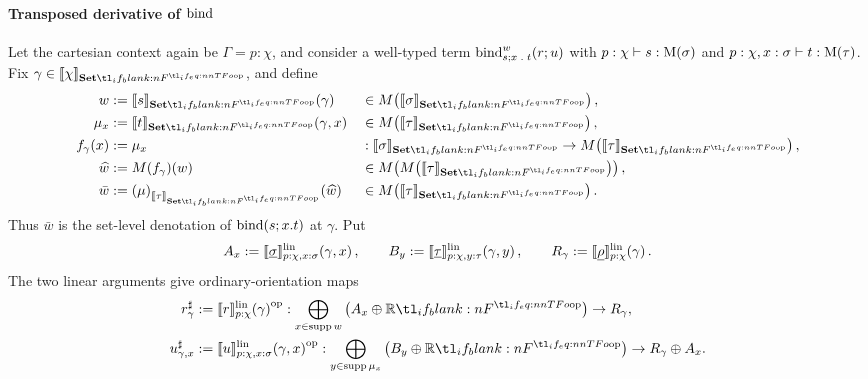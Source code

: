 \documentclass[11pt,a4paper]{article}
\theoremstyle{definition}
\theoremstyle{remark}
\providecommand{\supp}{\operatorname{supp}}
\providecommand{\lintype}[1]{\underline{#1}}
\providecommand{\setint}[1]{\llbracket #1\rrbracket_{\Set}}
\providecommand{\linint}[2]{\llbracket #1\rrbracket_{#2}^{\mathrm{lin}}}
\begin{document}
\paragraph{Transposed derivative of \( \opn[b]{bind} \)}
Let the cartesian context again be \(\Gamma=p:\chi\), and consider a well-typed term
\(
  \fn[n]{ \opn[b]{bind}^{w}_{s; x \; . \; t}}{ r ; u }
\)
with
\(p:\chi\vdash s:\Fun[nn]{\opn[b]{M}}{\sigma}\) and
\(p:\chi,x:\sigma\vdash t:\Fun[nn]{\opn[b]{M}}{\tau}\).
Fix \(\gamma\in\setint{\chi}\), and define
\begin{equation*}
  \begin{aligned}
    w
    &:= \fn[n]{\setint{s}}{\gamma}
      &&\in \Fun[nn]{M}{\setint{\sigma}},
    \\
    \mu_{x}
    &:= \fn[n]{\setint{t}}{\gamma,x}
      &&\in \Fun[nn]{M}{\setint{\tau}},
    \\
    f_{\gamma}(x)
    &:= \mu_{x}
      &&:\setint{\sigma}\to\Fun[nn]{M}{\setint{\tau}},
    \\
    \widehat w
    &:= \fn[n]{\Fun[nn]{M}{f_{\gamma}}}{w}
      &&\in \Fun[nn]{M}{\Fun[nn]{M}{\setint{\tau}}},
    \\
    \bar w
    &:= \fn[n]{\Nat[nn]{\mu}{\setint{\tau}}}{\widehat w}
      &&\in \Fun[nn]{M}{\setint{\tau}}.
  \end{aligned}
\end{equation*}
Thus \(\bar w\) is the set-level denotation of
\(\fn[n]{\opn[b]{bind}}{s;x.t}\) at \(\gamma\).  Put
\begin{equation*}
  A_{x}:=\fn[n]{\linint{\lintype{\sigma}}{p:\chi,x:\sigma}}{\gamma,x},
  \qquad
  B_{y}:=\fn[n]{\linint{\lintype{\tau}}{p:\chi,y:\tau}}{\gamma,y},
  \qquad
  R_{\gamma}:=\fn[n]{\linint{\lintype{\rho}}{p:\chi}}{\gamma}.
\end{equation*}
The two linear arguments give ordinary-orientation maps
\begin{equation*}
  \begin{aligned}
    r^{\sharp}_{\gamma}
    &:={}
      \opmor[p]{
        \fn[n]{\linint{r}{p:\chi}}{\gamma}
      }
      :
      \bigoplus_{x\in\supp w}
      \left(A_{x}\oplus\R\right)
      \to R_{\gamma},
    \\
    u^{\sharp}_{\gamma,x}
    &:={}
      \opmor[p]{
        \fn[n]{\linint{u}{p:\chi,x:\sigma}}{\gamma,x}
      }
      :
      \bigoplus_{y\in\supp \mu_{x}}
      \left(B_{y}\oplus\R\right)
      \to R_{\gamma}\oplus A_{x}.
  \end{aligned}
\end{equation*}
\end{document}
